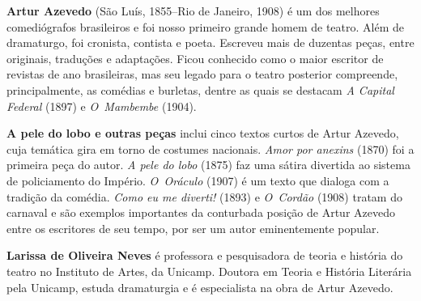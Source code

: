 \textbf{Artur Azevedo} (São Luís, 1855--Rio de Janeiro, 1908) é um dos
melhores comediógrafos brasileiros e foi nosso primeiro grande homem de
teatro. Além de dramaturgo, foi cronista, contista e poeta. Escreveu
mais de duzentas peças, entre originais, traduções e adaptações. Ficou
conhecido como o maior escritor de revistas de ano brasileiras, mas seu
legado para o teatro posterior compreende, principalmente, as comédias
e burletas, dentre as quais se destacam \textit{A Capital Federal}
(1897) e \textit{O~Mambembe} (1904).

\textbf{A pele do lobo e outras peças} inclui cinco textos curtos de
Artur Azevedo, cuja temática gira em torno de costumes nacionais.
\textit{Amor por anexins} (1870) foi a primeira peça do autor.
\textit{A pele do lobo} (1875) faz uma sátira divertida ao sistema de policiamento do
Império. \textit{\mbox{O Oráculo}} (1907) é um texto que dialoga com a
tradição da comédia.
\textit{Como eu me diverti!} (1893) e \textit{\mbox{O Cordão}} (1908)
tratam do carnaval e são exemplos importantes da conturbada
posição de Artur Azevedo entre os escritores de seu tempo, por ser um
autor eminentemente popular.

\textbf{Larissa de Oliveira Neves} é professora e pesquisadora de teoria
e história do teatro no Instituto de Artes, da Unicamp. Doutora em
Teoria e História Literária pela Unicamp, estuda dramaturgia e é
especialista na obra de Artur Azevedo.


